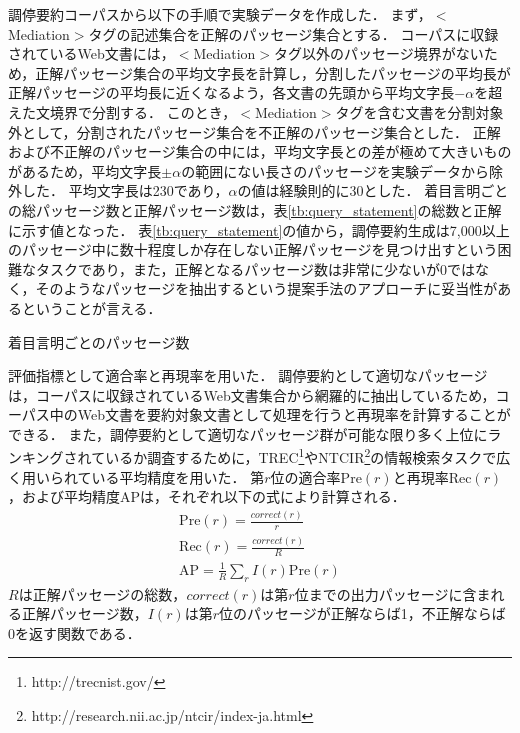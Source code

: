 \documentclass[japanese]{jnlp_1.4}
\begin{document}
調停要約コーパスから以下の手順で実験データを作成した．
まず，{\sf$<$Mediation$>$}タグの記述集合を正解のパッセージ集合とする．
コーパスに収録されているWeb文書には，{\sf$<$Mediation$>$}タグ以外のパッセージ境界がないため，正解パッセージ集合の平均文字長を計算し，分割したパッセージの平均長が正解パッセージの平均長に近くなるよう，各文書の先頭から平均文字長$-\alpha$を超えた文境界で分割する．
このとき，{\sf$<$Mediation$>$}タグを含む文書を分割対象外として，分割されたパッセージ集合を不正解のパッセージ集合とした．
正解および不正解のパッセージ集合の中には，平均文字長との差が極めて大きいものがあるため，平均文字長$\pm\alpha$の範囲にない長さのパッセージを実験データから除外した．
平均文字長は230であり，$\alpha$の値は経験則的に30とした．
着目言明ごとの総パッセージ数と正解パッセージ数は，表\ref{tb:query_statement}の総数と正解に示す値となった．
表\ref{tb:query_statement}の値から，調停要約生成は7,000以上のパッセージ中に数十程度しか存在しない正解パッセージを見つけ出すという困難なタスクであり，また，正解となるパッセージ数は非常に少ないが0ではなく，そのようなパッセージを抽出するという提案手法のアプローチに妥当性があるということが言える．

\begin{table}[t]
 \caption{着目言明ごとのパッセージ数}
 \label{tb:query_statement}

\end{table}

評価指標として適合率と再現率を用いた．
調停要約として適切なパッセージは，コーパスに収録されているWeb文書集合から網羅的に抽出しているため，コーパス中のWeb文書を要約対象文書として処理を行うと再現率を計算することができる．
また，調停要約として適切なパッセージ群が可能な限り多く上位にランキングされているか調査するために，TREC\footnote{http://trecnist.gov/}やNTCIR\footnote{http://research.nii.ac.jp/ntcir/index-ja.html}の情報検索タスクで広く用いられている平均精度を用いた．
第$r$位の適合率$\mathrm{Pre}(r)$と再現率$\mathrm{Rec}(r)$，および平均精度$\mathrm{AP}$は，それぞれ以下の式により計算される．
\begin{gather}
\mathrm{Pre}(r) = \frac{correct(r)}{r} \\
\mathrm{Rec}(r) = \frac{correct(r)}{R} \\
\mathrm{AP} = \frac{1}{R}\sum_r I(r)\mathrm{Pre}(r) \label{eq:average_precision}
\end{gather}
$R$は正解パッセージの総数，$correct(r)$は第$r$位までの出力パッセージに含まれる正解パッセージ数，$I(r)$は第$r$位のパッセージが正解ならば1，不正解ならば0を返す関数である．
\end{document}
